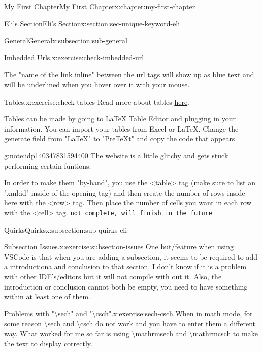 \documentclass[oneside,10pt,]{book}
\newcommand{\mono}[1]{\texttt{#1}}
\numberwithin{equation}{section}
\begin{document}
\begin{chapterptx}{My First Chapter}{}{My First Chapter}{}{}{x:chapter:my-first-chapter}
\begin{sectionptx}{Eli's Section}{}{Eli's Section}{}{}{x:section:sec-unique-keyword-eli}
\begin{subsectionptx}{General}{}{General}{}{}{x:subsection:sub-general}
\begin{inlineexercise}{Imbedded Urls.}{x:exercise:check-imbedded-url}
\par
The "name of the link inline" between the url tags will show up as blue text and will be underlined when you hover over it with your mouse.%
\end{inlineexercise}
\begin{inlineexercise}{Tables.}{x:exercise:check-tables}%
Read more about tables \href{https://pretextbook.org/doc/guide/html/topic-tabular.html}{here}.%
\par
Tables can be made by going to \href{}{LaTeX Table Editor} and plugging in your information. You can import your tables from Excel or LaTeX. Change the generate field from "LaTeX" to "PreTeXt" and copy the code that appears. \begin{note}{}{g:note:idp140347831594400}%
The website is a little glitchy and gets stuck performing certain funtions.\end{note}
%
\par
In order to make them "by-hand", you use the \textless{}table\textgreater{} tag (make sure to list an "xml:id" inside of the opening tag) and then create the number of rows inside here with the \textless{}row\textgreater{} tag. Then place the number of cells you want in each row with the \textless{}cell\textgreater{} tag. \mono{not complete, will finish in the future}%
\end{inlineexercise}
\end{subsectionptx}
%
%
\typeout{************************************************}
\typeout{************************************************}
%
\begin{subsectionptx}{Quirks}{}{Quirks}{}{}{x:subsection:sub-quirks-eli}
\begin{inlineexercise}{Subsection Issues.}{x:exercise:subsection-issues}%
One but\slash{}feature when using VSCode is that when you are adding a subsection, it seems to be required to add a introductiona and conclusion to that section. I don't know if it is a problem with other IDE's\slash{}editors but it will not compile with out it. Also, the introduction or conclusion cannot both be empty, you need to have something within at least one of them.%
\end{inlineexercise}
\begin{inlineexercise}{Problems with "\textbackslash{}sech" and "\textbackslash{}csch".}{x:exercise:sech-csch}%
When in math mode, for some reason \textbackslash{}sech and \textbackslash{}csch do not work and you have to enter them a different way. What worked for me so far is using \textbackslash{}mathrm\textbraceleft{}sech\textbraceright{} and \textbackslash{}mathrm\textbraceleft{}csch\textbraceright{} to make the text to display correctly.%

\end{inlineexercise}
\end{subsectionptx}
\end{sectionptx}
\end{chapterptx}
\end{document}
